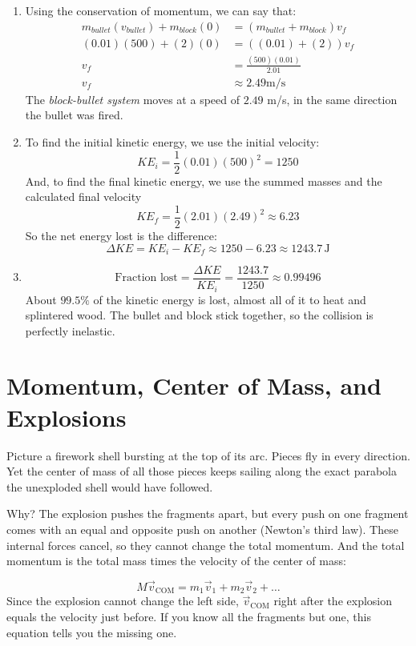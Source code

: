 \begin{Answer}[ref=bullet_in_wood]
\begin{enumerate}[label=(\alph*)]
  \item Using the conservation of momentum, we can say that:
  \begin{align*}
    m_{bullet}(v_{bullet}) + m_{block}(0) &= (m_{bullet} + m_{block})v_f \\ 
    (0.01)(500) + (2)(0) &= ((0.01) + (2))v_f \\ 
    v_f &= \frac{(500)(0.01)}{2.01} \\ 
    v_f &\approx 2.49 \text{m/s}
  \end{align*}
  The \emph{block-bullet system} moves at a speed of $2.49$ m/s, in the same direction the bullet was fired.
  \item 
  To find the initial kinetic energy, we use the initial velocity:
  \[KE_i = \frac{1}{2}(0.01)(500)^2 = 1250\]
  And, to find the final kinetic energy, we use the summed masses and the calculated final velocity
  \[KE_f = \frac{1}{2}(2.01)(2.49)^2 \approx 6.23\]
  So the net energy lost is the difference:
  $$\Delta KE = KE_i - KE_f \approx 1250 - 6.23 \approx 1243.7 \,\text{J}$$
  \item 
  $$\text{Fraction lost} = \frac{\Delta KE}{KE_i}= \frac{1243.7}{1250}\approx 0.99496$$
  About $99.5\%$ of the kinetic energy is lost, almost all of it to heat
  and splintered wood. The bullet and block stick together, so the
  collision is perfectly inelastic.
\end{enumerate}
\end{Answer}

\section{Momentum, Center of Mass, and Explosions}

Picture a firework shell bursting at the top of its arc. Pieces fly in
every direction. Yet the center of mass of all those
pieces keeps sailing along the exact parabola the unexploded shell would
have followed.

Why? The explosion pushes the fragments apart, but
every push on one fragment comes with an equal and opposite push on
another (Newton's third law). These internal forces cancel, so they cannot
change the total momentum. And the total momentum is the total mass times
the velocity of the center of mass:

$$M \vec v_{\text{COM}} = m_1 \vec v_1 + m_2 \vec v_2 + \dots$$
Since the explosion cannot change the left side, $\vec v_{\text{COM}}$
right after the explosion equals the velocity just before. If you know all
the fragments but one, this equation tells you the missing one.

